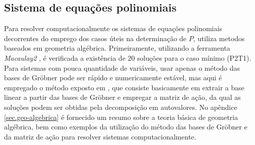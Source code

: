 \subsection{Sistema de equações polinomiais}

Para resolver computacionalmente os sistemas de equações polinomiais decorrentes do emprego dos casos úteis na determinação de $P$, \citep{bib:kuang} utiliza metodos baseados em geometria algébrica. Primeiramente, utilizando a ferramenta {\it Macaulay2} \citep{macaulay2}, é verificada a existência de 20 soluções para o caso mínimo (P2T1). Para sistemas com pouca quantidade de variáveis, usar apenas o método das bases de Gr\"obner pode ser rápido e numericamente estável, mas aqui é empregado o método exposto em \citep{byrod}, que consiste basicamente em extrair a base linear a partir das bases de Gr\"obner e empregar a matriz de ação, da qual as soluções podem ser obtidas pela decomposição em autovalores. No apêndice \ref{sec.geo-algebrica} é fornecido um resumo sobre a teoria básica de geometria algébrica, bem como exemplos da utilização do método das bases de Gr\"obner e da matriz de ação para resolver sistemas computacionalmente.




